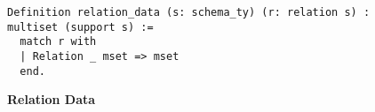 \begin{figure}
\begin{center}
\begin{lstlisting}
Definition relation_data (s: schema_ty) (r: relation s) : multiset (support s) :=
  match r with
  | Relation _ mset => mset
  end.
\end{lstlisting}
\end{center}
\caption{\textbf{Relation Data}}
\label{fig-relationdata}
\end{figure}
